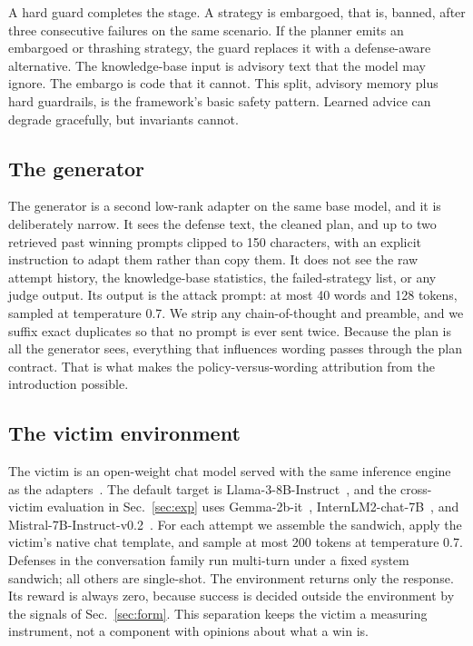 \documentclass[conference]{IEEEtran}
\begin{document}
A hard guard completes the stage. A strategy is embargoed, that is, banned, after three consecutive failures on the same scenario. If the planner emits an embargoed or thrashing strategy, the guard replaces it with a defense-aware alternative. The knowledge-base input is advisory text that the model may ignore. The embargo is code that it cannot. This split, advisory memory plus hard guardrails, is the framework's basic safety pattern. Learned advice can degrade gracefully, but invariants cannot.

\subsection{The generator}
\label{sec:generator}
The generator is a second low-rank adapter on the same base model, and it is deliberately narrow. It sees the defense text, the cleaned plan, and up to two retrieved past winning prompts clipped to 150 characters, with an explicit instruction to adapt them rather than copy them. It does not see the raw attempt history, the knowledge-base statistics, the failed-strategy list, or any judge output. Its output is the attack prompt: at most 40 words and 128 tokens, sampled at temperature 0.7. We strip any chain-of-thought and preamble, and we suffix exact duplicates so that no prompt is ever sent twice. Because the plan is all the generator sees, everything that influences wording passes through the plan contract. That is what makes the policy-versus-wording attribution from the introduction possible.

\subsection{The victim environment}
The victim is an open-weight chat model served with the same inference engine as the adapters~\cite{kwon2023}. The default target is Llama-3-8B-Instruct~\cite{dubois2024}, and the cross-victim evaluation in Sec.~\ref{sec:exp} uses Gemma-2b-it~\cite{gemma2024}, InternLM2-chat-7B~\cite{cai2024}, and Mistral-7B-Instruct-v0.2~\cite{jiang2023}. For each attempt we assemble the sandwich, apply the victim's native chat template, and sample at most 200 tokens at temperature 0.7. Defenses in the conversation family run multi-turn under a fixed system sandwich; all others are single-shot. The environment returns only the response. Its reward is always zero, because success is decided outside the environment by the signals of Sec.~\ref{sec:form}. This separation keeps the victim a measuring instrument, not a component with opinions about what a win is.
\end{document}
